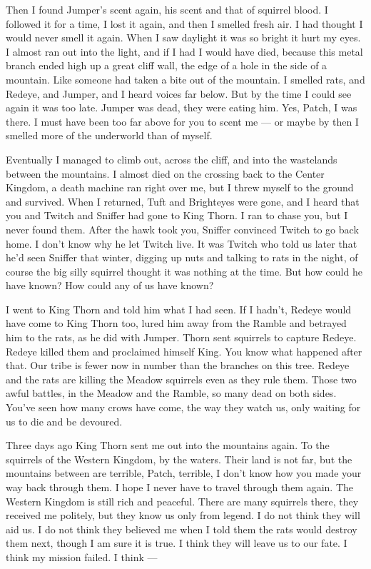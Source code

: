 \documentclass[ebook,oneside,openany,17pt]{memoir}
\begin{document}
Then I found Jumper’s scent again, his scent and that of squirrel
blood. I followed it for a time, I lost it again, and then I smelled
fresh air. I had thought I would never smell it again. When I saw
daylight it was so bright it hurt my eyes. I almost ran out into the
light, and if I had I would have died, because this metal branch ended
high up a great cliff wall, the edge of a hole in the side of a
mountain. Like someone had taken a bite out of the mountain. I smelled
rats, and Redeye, and Jumper, and I heard voices far below. But by the
time I could see again it was too late. Jumper was dead, they were
eating him. Yes, Patch, I was there. I must have been too far above
for you to scent me — or maybe by then I smelled more of the
underworld than of myself.

Eventually I managed to climb out, across the cliff, and into the
wastelands between the mountains. I almost died on the crossing back
to the Center Kingdom, a death machine ran right over me, but I threw
myself to the ground and survived. When I returned, Tuft and
Brighteyes were gone, and I heard that you and Twitch and Sniffer had
gone to King Thorn. I ran to chase you, but I never found them. After
the hawk took you, Sniffer convinced Twitch to go back home. I don’t
know why he let Twitch live. It was Twitch who told us later that he’d
seen Sniffer that winter, digging up nuts and talking to rats in the
night, of course the big silly squirrel thought it was nothing at the
time. But how could he have known? How could any of us have known?

I went to King Thorn and told him what I had seen. If I hadn’t, Redeye
would have come to King Thorn too, lured him away from the Ramble and
betrayed him to the rats, as he did with Jumper. Thorn sent squirrels
to capture Redeye. Redeye killed them and proclaimed himself King. You
know what happened after that. Our tribe is fewer now in number than
the branches on this tree. Redeye and the rats are killing the Meadow
squirrels even as they rule them. Those two awful battles, in the
Meadow and the Ramble, so many dead on both sides. You’ve seen how
many crows have come, the way they watch us, only waiting for us to
die and be devoured.

Three days ago King Thorn sent me out into the mountains again. To the
squirrels of the Western Kingdom, by the waters. Their land is not
far, but the mountains between are terrible, Patch, terrible, I don’t
know how you made your way back through them. I hope I never have to
travel through them again. The Western Kingdom is still rich and
peaceful. There are many squirrels there, they received me politely,
but they know us only from legend. I do not think they will aid us. I
do not think they believed me when I told them the rats would destroy
them next, though I am sure it is true. I think they will leave us to
our fate. I think my mission failed. I think —
\end{document}
